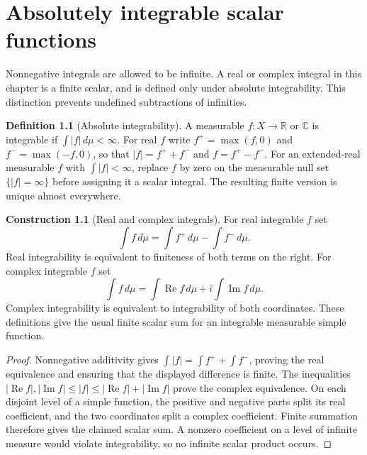 \documentclass[11pt,oneside,openany]{book}
\theoremstyle{definition}
\newtheorem{definition}[theorem]{Definition}
\newtheorem{construction}[theorem]{Construction}
\theoremstyle{remark}
\newcommand{\R}{\mathbb R}\newcommand{\C}{\mathbb C}
\newcommand{\family}[1]{}
\begin{document}


\chapter{Absolutely integrable scalar functions}\label{ch:d11-06}
Nonnegative integrals are allowed to be infinite. A real or complex integral
in this chapter is a finite scalar, and is defined only under absolute
integrability. This distinction prevents undefined subtractions of infinities.

\begin{definition}[Absolute integrability]
\family{D11.06.absolute_integrability}\label{d11:06:absolute-integrability}
A measurable $f:X\to\R$ or $\C$ is integrable if
$\int|f|\,d\mu<\infty$. For real $f$ write
$f^+=\max(f,0)$ and $f^-=\max(-f,0)$, so that
$|f|=f^++f^-$ and $f=f^+-f^-$. For an extended-real measurable $f$ with
$\int|f|<\infty$, replace $f$ by zero on the measurable null set
$\{|f|=\infty\}$ before assigning it a scalar integral. The resulting
finite version is unique almost everywhere.
\end{definition}

\begin{construction}[Real and complex integrals]
\family{D11.06.scalar_integral}\label{d11:06:scalar-integral}
For real integrable $f$ set
\[
 \int f\,d\mu=\int f^+\,d\mu-\int f^-\,d\mu.
\]
Real integrability is equivalent to finiteness of both terms on the right.
For complex integrable $f$ set
\[
 \int f\,d\mu=\int\operatorname{Re}f\,d\mu
             +i\int\operatorname{Im}f\,d\mu.
\]
Complex integrability is equivalent to integrability of both coordinates.
These definitions give the usual finite scalar sum for an integrable
measurable simple function.
\end{construction}
\begin{proof}
Nonnegative additivity gives $\int|f|=\int f^++\int f^-$, proving the
real equivalence and ensuring that the displayed difference is finite.
The inequalities
$|\operatorname{Re}f|,|\operatorname{Im}f|\leq|f|
\leq|\operatorname{Re}f|+|\operatorname{Im}f|$
prove the complex equivalence. On each disjoint level of a simple function,
the positive and negative parts split its real coefficient, and the two
coordinates split a complex coefficient. Finite summation therefore gives
the claimed scalar sum. A nonzero coefficient on a level of infinite
measure would violate integrability, so no infinite scalar product occurs.
\end{proof}
\end{document}
